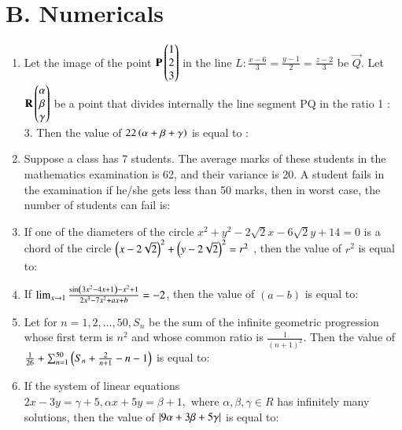 \documentclass[journal]{IEEEtran}
\theoremstyle{remark}
\begin{document}
\section*{B. Numericals}
\begin{enumerate}

\item  Let the image of the point $\mathbf{P}\begin{pmatrix}1\\ 2\\ 3\end{pmatrix}$ in the line $L: \frac{x - 6}{3} = \frac{y - 1}{2} = \frac{z - 2}{3}$ be $\vec{Q}$. Let $\mathbf{R} \begin{pmatrix}\alpha \\ \beta \\ \gamma\end{pmatrix}$ be a point that divides internally the line segment PQ in the ratio 1 : 3. Then the value of $22\left(\alpha + \beta + \gamma\right)$ is equal to :\\


\item Suppose a class has 7 students. The average marks of these students in the mathematics examination is 62, and their variance is 20. A student fails in the examination if he/she gets less than 50 marks, then in worst case, the number of students can fail is:\\


\item If one of the diameters of the circle $x^2 + y^2 - 2\sqrt{2}x - 6\sqrt{2}y + 14 = 0$ is a chord of the circle
${\left( x - 2\sqrt{2} \right)}^2 + {\left( y - 2\sqrt{2} \right)}^2 = r^2$ , then the value of $r^2$ is equal to:\\

\item If $\lim_{x \to 1} \frac{\sin\left(3x^2 - 4x + 1\right) - x^2 + 1}{2x^3 - 7x^2 + ax + b} = -2$, then the value of $(a - b)$ is equal to:\\

\item Let for $n = 1, 2,\dots, 50, S_n$ be the sum of the infinite geometric progression whose first term is $n^2$ and whose common ratio is $\frac{1}{(n + 1)^2}$. Then the value of $\frac{1}{26} + \sum_{n=1}^{50} \left( S_n + \frac{2}{n + 1} - n - 1\right) $ is equal to:\\


\item If the system of linear equations $2x - 3y = \gamma + 5, \alpha x + 5y = \beta + 1, \text{ where } \alpha, \beta, \gamma \in R$ has infinitely many solutions, then the value of $\left\vert9\alpha + 3\beta + 5\gamma\right\vert$ is equal to:\\


\end{enumerate}
\end{document}
